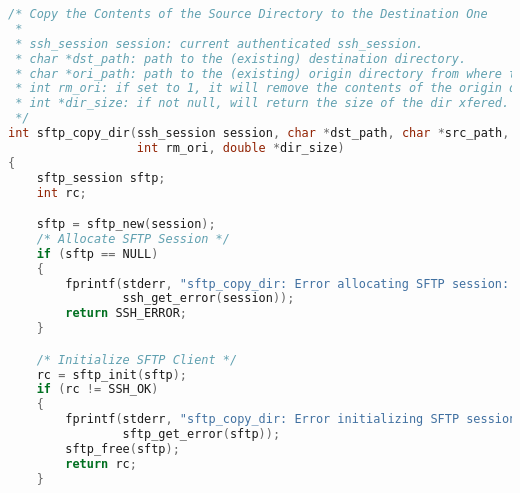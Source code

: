 \begin{lstlisting}[language=C,caption={Signature and schematic implementation of remote execution methods.},label={code:libssh}]
/* Copy the Contents of the Source Directory to the Destination One 
 *
 * ssh_session session: current authenticated ssh_session.
 * char *dst_path: path to the (existing) destination directory.
 * char *ori_path: path to the (existing) origin directory from where to copy.
 * int rm_ori: if set to 1, it will remove the contents of the origin directory.
 * int *dir_size: if not null, will return the size of the dir xfered.
 */
int sftp_copy_dir(ssh_session session, char *dst_path, char *src_path,
                  int rm_ori, double *dir_size)
{
    sftp_session sftp;
    int rc;

    sftp = sftp_new(session);
    /* Allocate SFTP Session */
    if (sftp == NULL)
    {
        fprintf(stderr, "sftp_copy_dir: Error allocating SFTP session: %s\n",
                ssh_get_error(session));
        return SSH_ERROR;
    }

    /* Initialize SFTP Client */
    rc = sftp_init(sftp);
    if (rc != SSH_OK)
    {
        fprintf(stderr, "sftp_copy_dir: Error initializing SFTP session: %d\n",
                sftp_get_error(sftp));
        sftp_free(sftp);
        return rc;
    }


\end{lstlisting}
